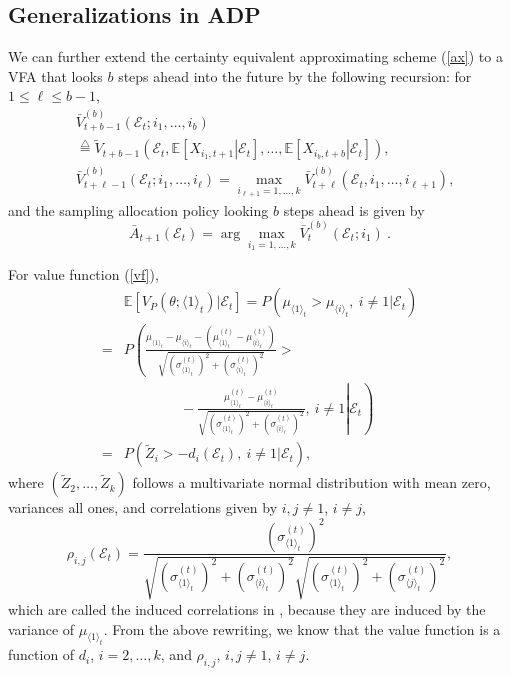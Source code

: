 \documentclass[journal]{IEEEtran}
\newcommand{\ed}{\stackrel{\triangle}{=}}
\begin{document}
\subsection{Generalizations in ADP}\label{gadp}
We can further extend the certainty equivalent approximating scheme (\ref{ax}) to a VFA that looks $b$ steps ahead into the future by the following recursion: for $1\leq\ell\leq b-1$, 
\begin{align*}
&\bar{V}_{t+b-1}^{(b)}(\mathcal{E}_{t};i_1,\ldots,i_{b})\\
&\ed\widetilde{V}_{t+b-1}\left(\mathcal{E}_{t},\left.\mathbb{E}\left[X_{i_1,t+1}\right|\mathcal{E}_{t}\right], \ldots, \left.\mathbb{E}\left[X_{i_b,t+b}\right|\mathcal{E}_{t}\right]\right),\\
&\bar{V}_{t+\ell-1}^{(b)}\left(\mathcal{E}_{t};i_1,\ldots,i_{\ell}\right)=\max_{i_{\ell+1}=1,\ldots,k}\bar{V}_{t+\ell}^{(b)}\left(\mathcal{E}_{t},i_1,\ldots,i_{\ell+1}\right),
\end{align*}
and the sampling allocation policy looking $b$ steps ahead is given by 
\begin{equation*}\label{map2}
\bar{A}_{t+1}(\mathcal{E}_{t})=\arg\max_{i_1=1,\ldots,k}\bar{V}_{t}^{(b)}(\mathcal{E}_{t};i_1)~.\end{equation*}

For value function (\ref{vf}), 
 \begin{align*}
& \mathbb{E}[V_P(\theta;\langle 1 \rangle_t)| \mathcal{E}_t]=P\left( \mu_{\langle 1 \rangle_t}>\mu_{\langle i \rangle_t},~i\neq 1|\mathcal{E}_t\right)\\
 = &P\left( \frac{\mu_{\langle 1 \rangle_t}-\mu_{\langle i \rangle_t}-\left( \mu_{\langle 1 \rangle_t}^{(t)}-\mu_{\langle i \rangle_t}^{(t)} \right)}{\sqrt{\left(\sigma_{\langle 1 \rangle_t}^{(t)}\right)^2+\left(\sigma_{\langle i \rangle_t}^{(t)}\right)^2}}>\right.\\
  &\left.\left.\qquad\qquad-\frac{\mu_{\langle 1 \rangle_t}^{(t)}-\mu_{\langle i \rangle_t}^{(t)}}{\sqrt{\left(\sigma_{\langle 1 \rangle_t}^{(t)}\right)^2+\left(\sigma_{\langle i \rangle_t}^{(t)}\right)^2}},~i\neq 1\right|\mathcal{E}_t\right)\\
  = &P\left( \widetilde{Z}_i> -d_i(\mathcal{E}_t),~i\neq 1|\mathcal{E}_t\right), \end{align*}
  where $(\widetilde{Z}_2,\ldots,\widetilde{Z}_k)$ follows a multivariate normal distribution with mean zero, variances all ones, and correlations given by $i,j\neq 1$, $i\neq j$, 
  $$\rho_{i,j}(\mathcal{E}_t)=\frac{\left(\sigma_{\langle 1 \rangle_t}^{(t)}\right)^2}{\sqrt{\left(\sigma_{\langle 1 \rangle_t}^{(t)}\right)^2+\left(\sigma_{\langle i \rangle_t}^{(t)}\right)^2}\sqrt{\left(\sigma_{\langle 1 \rangle_t}^{(t)}\right)^2+\left(\sigma_{\langle j\rangle_t}^{(t)}\right)^2}},$$
  which are called the induced correlations in \cite{peng2016gradient}, because they are induced by the variance of $\mu_{\langle 1 \rangle_t}$. From the above rewriting, we know that the value function is a function of $d_i$, $i=2,\ldots,k$, and $\rho_{i,j}$, $i,j\neq 1$, $i\neq j$. 
  
\end{document}
